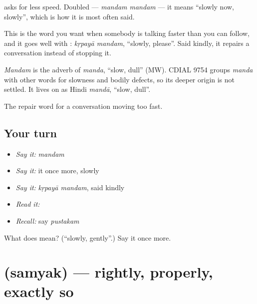\textbf{} asks for less speed. Doubled — \emph{mandam mandam} — it means \textquotedblleft{}slowly now, slowly\textquotedblright{}, which is how it is most often said.

This is the word you want when somebody is talking faster than you can follow, and it goes well with \textbf{}: \emph{kṛpayā mandam}, \textquotedblleft{}slowly, please\textquotedblright{}. Said kindly, it repairs a conversation instead of stopping it.

\begin{cousinweb}
\emph{Mandam} is the adverb of \emph{manda}, \textquotedblleft{}slow, dull\textquotedblright{} (MW). CDIAL 9754 groups \emph{manda} with other words for slowness and bodily defects, so its deeper origin is not settled. It lives on as Hindi \emph{mandā}, \textquotedblleft{}slow, dull\textquotedblright{}.
\end{cousinweb}

\begin{grammarlens}[title={What you've built}]
The repair word for a conversation moving too fast.
\end{grammarlens}

\subsection*{Your turn}
\begin{itemize}
\raggedright
  \item \emph{Say it:} \emph{mandam}
  \item \emph{Say it:} it once more, slowly
  \item \emph{Say it:} \emph{kṛpayā mandam}, said kindly
  \item \emph{Read it:} \textbf{}
  \item \emph{Recall:} say \emph{pustakam}
\end{itemize}

\begin{tcolorbox}[breakable,colback=teal!4,colframe=teal!35!black,title={Before you move on}]
What does  mean? (\textquotedblleft{}slowly, gently\textquotedblright{}.) Say it once more.
\end{tcolorbox}
\section[\texorpdfstring{\sk{सम्यक्} (samyak)}{सम्यक् (samyak)}]{ (samyak) — rightly, properly, exactly so}

